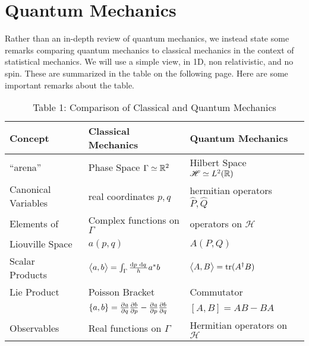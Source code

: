 \chapter{Quantum Mechanics}
Rather than an in-depth review of quantum mechanics, we instead state some remarks comparing quantum mechanics to classical mechanics in the context of statistical mechanics. We will use a simple view, in 1D, non relativistic, and no spin. These are summarized in the table on the following page. Here are some important remarks about the table.


\begin{table}[!htbp]
\begin{center}
	\caption{Table 1: Comparison of Classical and Quantum Mechanics}\label{tab:comparison}
	\begin{tabular}{l||l|ll}
		Concept&Classical Mechanics & Quantum Mechanics\\
		\hline\hline
		``arena'' & Phase Space \(\Gamma\simeq \mathbb{R}^2\) & Hilbert Space\footnotemark\ \(\mathscr H\simeq L^2(\mathbb{R})\)&\begin{minipage}[c][10mm][t]{0.1mm}\end{minipage}\\
		\hline 
		Canonical Variables & real coordinates \(p,q\) & hermitian operators \(\hat P, \hat Q\)\begin{minipage}[c][10mm][t]{0.1mm}\end{minipage}\\
		\hline
		Elements of & Complex functions on \(\Gamma\) & operators on \(\mathscr H\) \\
		Liouville Space\footnotemark\ & \(a(p,q)\) & \(A(P,Q)\)\begin{minipage}[c][10mm][t]{0.1mm}\end{minipage}\\
		\hline 
		Scalar Products\footnotemark\ & \(\vect{a,b} = \int_\Gamma \frac{\d{p}\d{q}}{h}a\ast b\) & \(\left\langle \begin{matrix}A,B\end{matrix} \right\rangle = \operatorname{tr}(A^{\dagger} B)\)\begin{minipage}[c][10mm][t]{0.1mm}\end{minipage}\\
		\hline 
		Lie Product\footnotemark\ & Poisson Bracket & Commutator\footnotemark\\
					  & \(\{a,b\} = \frac{\partial a}{\partial q}\frac{\partial b}{\partial p}-\frac{\partial a}{\partial p}\frac{\partial b}{\partial q}\)& \([A,B] = AB-BA\)\begin{minipage}[c][10mm][t]{0.1mm}\end{minipage}\\
		\hline 
		Observables & Real functions on \(\Gamma\) & Hermitian operators on \(\mathscr H\)\begin{minipage}[c][10mm][t]{0.1mm}\end{minipage}\\

\end{tabular}
\end{center}
\end{table}
